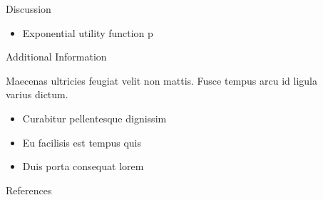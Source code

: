 \documentclass[final]{beamer}
\newlength{\sepwid}
\newlength{\onecolwid}
\newlength{\twocolwid}
\begin{document}
\begin{frame}
\begin{columns}[t]
\begin{column}{\twocolwid}
\end{column} %

\begin{column}{\sepwid}\end{column} %

\begin{column}{\onecolwid} %


\begin{exampleblock}{Discussion}

\begin{itemize}
    \item Exponential utility function p
\end{itemize}

\end{exampleblock}


\begin{exampleblock}{Additional Information}

Maecenas ultricies feugiat velit non mattis. Fusce tempus arcu id ligula varius dictum. 
\begin{itemize}
\item Curabitur pellentesque dignissim
\item Eu facilisis est tempus quis
\item Duis porta consequat lorem
\end{itemize}

\end{exampleblock}


\begin{exampleblock}{References}

\nocite{*} %
\small{
\vspace{1cm}}
\end{exampleblock}


\end{column}
\end{columns}
\end{frame}
\end{document}
